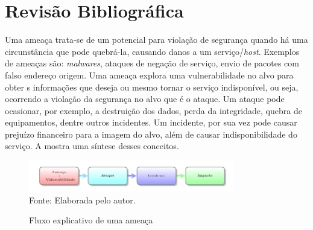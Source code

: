 \chapter[Revisão Bibliográfica]{Revisão Bibliográfica}

Uma ameaça trata-se de um potencial para violação de segurança quando há uma circunstância que pode quebrá-la, causando danos a um serviço/\textit{host}. Exemplos de ameaças são: \textit{malwares}, ataques de negação de serviço, envio de pacotes com falso endereço origem. Uma ameaça explora uma vulnerabilidade no alvo para obter s informações que deseja ou mesmo tornar o serviço indisponível, ou seja, ocorrendo a violação da segurança no alvo que é o ataque. Um ataque pode ocasionar, por exemplo, a destruição dos dados, perda da integridade, quebra de equipamentos, dentre outros incidentes. Um incidente, por sua vez pode causar prejuízo financeiro para a imagem do alvo, além de causar indisponibilidade do serviço. A  mostra uma síntese desses conceitos.   

 \begin{figure}[ht]
 	\centering
 	\caption{Fluxo explicativo de uma ameaça }
 	\includegraphics[width=0.8\textwidth]{figs/ameacas.pdf}\\
 	{Fonte: Elaborada pelo autor.}
 	\label{fig:ameacas}
 \end{figure}

